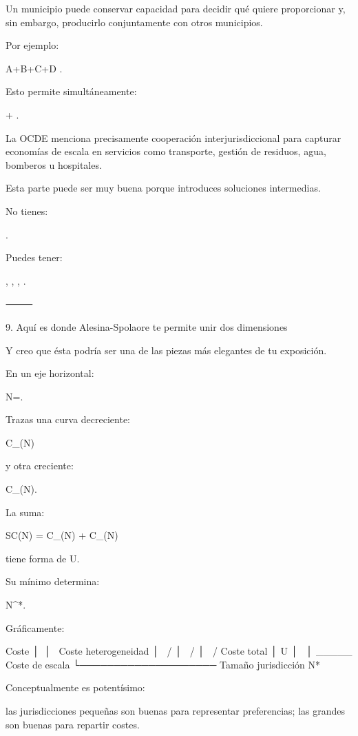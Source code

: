 \documentclass[10pt,a4paper]{article}
\begin{document}
Un municipio puede conservar capacidad para decidir qué quiere proporcionar y, sin embargo, producirlo conjuntamente con otros municipios.

Por ejemplo:

A+B+C+D
\longrightarrow
{}.

Esto permite simultáneamente:

+
.

La OCDE menciona precisamente cooperación interjurisdiccional para capturar economías de escala en servicios como transporte, gestión de residuos, agua, bomberos u hospitales.  

Esta parte puede ser muy buena porque introduces soluciones intermedias.

No tienes:

\quad {}\quad {}.

Puedes tener:

,
\quad
{},
\quad
{},
\quad
{}.

⸻

9. Aquí es donde Alesina-Spolaore te permite unir dos dimensiones

Y creo que ésta podría ser una de las piezas más elegantes de tu exposición.

En un eje horizontal:

N=.

Trazas una curva decreciente:

C_{}(N)

y otra creciente:

C_{}(N).

La suma:

SC(N)
=
C_{}(N)
+
C_{}(N)

tiene forma de U.

Su mínimo determina:

N^*.

Gráficamente:

Coste
  │\
  │ \       Coste heterogeneidad
  │  \     /
  │   \   /
  │    \ /      Coste total
  │     U
  │      \
  │       \_____ Coste de escala
  └──────────────────── Tamaño jurisdicción
              N*

Conceptualmente es potentísimo:

las jurisdicciones pequeñas son buenas para representar preferencias; las grandes son buenas para repartir costes.
\end{document}
